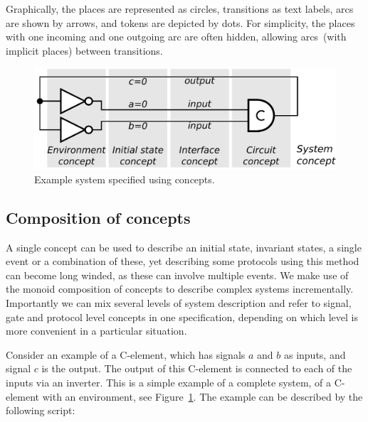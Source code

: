 \documentclass[british, journal]{IEEEtran}
\begin{document}
Graphically, the places are represented as circles, transitions as
text labels, arcs are shown by arrows, and tokens are depicted by dots.
For simplicity, the places with one incoming
and one outgoing arc are often hidden, allowing arcs~(with implicit
places) between transitions.

\begin{figure}[t]
\begin{centering}
\includegraphics[scale=0.51]{Images/C-element-with-environment}
\par\end{centering}
\vspace{-1mm}
\protect\caption{\label{fig:cElement-concepts}Example system specified using concepts.}
\vspace{-5mm}
\end{figure}

\vspace{-1mm}
\subsection{Composition of concepts\label{sub:Comp-of-concepts}}

A single concept can be used to describe an initial state, invariant
states, a single event or a combination of these, yet describing some
protocols using this method can become long winded, as these can involve
multiple events. We make use of the monoid composition of concepts
to describe complex systems incrementally. Importantly we can mix
several levels of system description and refer to signal, gate and
protocol level concepts in one specification, depending on which level
is more convenient in a particular situation.

Consider an example of a C-element, which has signals $a$ and $b$ as inputs,
and signal $c$ is the output. The output of this C-element is connected to
each of the inputs via an inverter. This is a simple example of a complete
system, of a C-element with an environment, see Figure~\ref{fig:cElement-concepts}.
The example can be described by the following script:
\end{document}
